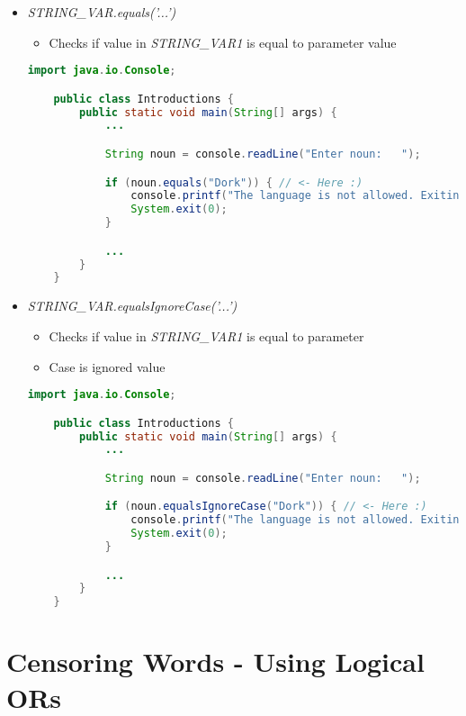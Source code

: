 \documentclass[12pt]{article}
\begin{document}
\begin{itemize}
    \item \textit{STRING\_VAR.equals('...')}
    \begin{itemize}
        \item Checks if value in \textit{STRING\_VAR1} is equal to parameter
        value
    \end{itemize}
    \begin{lstlisting}[language=Java]
    import java.io.Console;

    public class Introductions {
        public static void main(String[] args) {
            ...

            String noun = console.readLine("Enter noun:   ");

            if (noun.equals("Dork")) { // <- Here :)
                console.printf("The language is not allowed. Exiting\n");
                System.exit(0);
            }

            ...
        }
    }
    \end{lstlisting}
    \item \textit{STRING\_VAR.equalsIgnoreCase('...')}
    \begin{itemize}
        \item Checks if value in \textit{STRING\_VAR1} is equal to parameter
        \item Case is ignored
        value
    \end{itemize}

    \bigskip

    \begin{lstlisting}[language=Java]
    import java.io.Console;

    public class Introductions {
        public static void main(String[] args) {
            ...

            String noun = console.readLine("Enter noun:   ");

            if (noun.equalsIgnoreCase("Dork")) { // <- Here :)
                console.printf("The language is not allowed. Exiting\n");
                System.exit(0);
            }

            ...
        }
    }
    \end{lstlisting}
\end{itemize}

\section{Censoring Words - Using Logical ORs}
\end{document}
